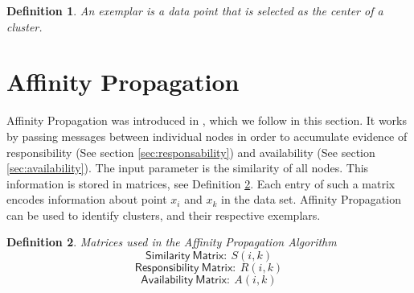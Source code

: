 \documentclass[11pt,a4paper]{article}
\newtheorem{definition}{Definition}
\begin{document}
\begin{definition}\label{def:exemplar}
	An exemplar is a data point that is selected as the center of a cluster.
\end{definition}
\section{Affinity Propagation}

Affinity Propagation was introduced in \cite{frey2007clustering}, which we follow in this section. It works by passing messages between individual nodes in order to accumulate evidence of responsibility (See section \ref{sec:responsability}) and availability (See section \ref{sec:availability}). The input parameter is the similarity of all nodes. This information is stored in matrices, see Definition \ref{def:matrices}. Each entry of such a matrix encodes information about point $x_i$ and $x_k$ in the data set. Affinity Propagation can be used to identify clusters, and their respective exemplars.
\begin{definition}\label{def:matrices}
	Matrices used in the Affinity Propagation Algorithm
	\[
		\mathsf{Similarity\ Matrix:}\  S(i,k)
	\]
	\[
		\mathsf{Responsibility\ Matrix:}\  R(i,k)
	\]
	\[
		\mathsf{Availability\ Matrix:}\  A(i,k)
	\]
\end{definition}
\end{document}
